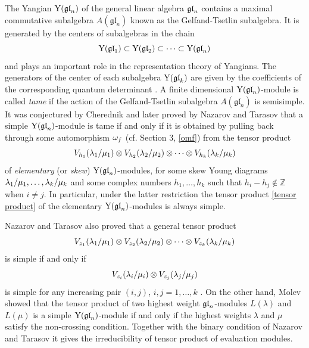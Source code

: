 \documentclass[12pt]{amsart}
\begin{document}
The Yangian ${\rm Y}(\mathfrak{gl}_{n})$ of the general  linear algebra $\mathfrak{gl}_{n}$ contains  a maximal commutative subalgebra \( A(\mathfrak{gl}_n) \) known as the  Gelfand-Tsetlin subalgebra.
It is generated by the centers of subalgebras in the chain
\[{\rm Y}(\mathfrak{gl}_1) \subset {\rm Y}(\mathfrak{gl}_2) \subset \cdots \subset {\rm Y}(\mathfrak{gl}_n)\]
and plays an important role in the representation theory of Yangians.
The generators of the center of each subalgebra ${\rm Y}(\mathfrak{gl}_k)$ are given by the coefficients of the corresponding quantum determinant \cite{MNO 1996,Mol 2007}.
A finite dimensional ${\rm Y}(\mathfrak{gl}_{n})$-module is called \emph{tame} if the action of  the Gelfand-Tsetlin  subalgebra \( A(\mathfrak{gl}_n) \) is semisimple.
It was conjectured by Cherednik \cite{Che} and later proved by Nazarov and Tarasov \cite{NT 1998} that a simple ${\rm Y}(\mathfrak{gl}_{n})$-module is tame if and only if it
is obtained by pulling back through some automorphism $\omega_f$ (cf. Section 3, \eqref{omf}) from the tensor product
\begin{equation}\label{tensor product}
V_{h_1}(\lambda_1\slash\mu_1)\otimes V_{h_2}(\lambda_2\slash\mu_2)\otimes \cdots\otimes V_{h_k}(\lambda_k\slash\mu_k)
\end{equation}
of \emph{elementary} (or \emph{skew}) \( {\rm Y}(\mathfrak{gl}_n) \)-modules, for some skew Young diagrams \( \lambda_1\slash\mu_1, \ldots, \lambda_k\slash\mu_k \) and some complex numbers \( h_1, \ldots, h_k \) such that \( h_i - h_j \notin \mathbb{Z} \) when \( i \neq j \).
 In particular, under the latter restriction
 the tensor product  \eqref{tensor product} of the elementary \( {\rm Y}(\mathfrak{gl}_n) \)-modules is always simple.

Nazarov and Tarasov also proved that  a general tensor product \begin{equation}
V_{z_1}(\lambda_1\slash\mu_1)\otimes V_{z_2}(\lambda_2\slash\mu_2)\otimes \cdots\otimes V_{z_k}(\lambda_k\slash\mu_k)
\end{equation} is simple if and only if
\[V_{z_i}(\lambda_i\slash\mu_i)\otimes V_{z_j}(\lambda_j\slash\mu_j)\] is simple for any increasing pair \((i, j)\), \(i, j=1, \ldots, k\) .
On the other hand,  Molev \cite{Mol 2002} showed that the  tensor product
of  two highest weight $\mathfrak{gl}_{n}$-modules $L(\lambda)$ and $L(\mu)$  is a simple \({\rm Y}(\mathfrak{gl}_n)\)-module if and only if the highest weights \(\lambda\) and \(\mu\) satisfy the non-crossing condition. Together with the binary condition of Nazarov and Tarasov it gives the irreducibility of tensor product of evaluation modules.
\end{document}
